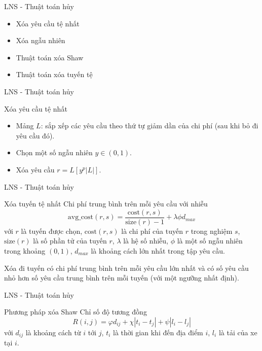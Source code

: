 \begin{frame}{LNS - Thuật toán hủy}
  \begin{itemize}
    \item Xóa yêu cầu tệ nhất
    \item Xóa ngẫu nhiên
    \item Thuật toán xóa Shaw
    \item Thuật toán xóa tuyến tệ
  \end{itemize}
\end{frame}

\begin{frame}{LNS - Thuật toán hủy}
  \begin{block}{Xóa yêu cầu tệ nhất}
    \begin{itemize}
      \item Mảng $L$: sắp xếp các yêu cầu theo thứ tự giảm dần của chi phí (sau khi bỏ đi yêu cầu đó).
      \item Chọn một số ngẫu nhiên $y \in (0,1)$.
      \item Xóa yêu cầu $r = L[y^p|L|]$.
    \end{itemize}
  \end{block}
\end{frame}

\begin{frame}{LNS - Thuật toán hủy}
  \begin{block}{Xóa tuyến tệ nhất}
    Chi phí trung bình trên mỗi yêu cầu với nhiễu
    \begin{equation}
      \label{eq:destroy_route}
      \text{avg\_cost}(r, s) = \frac{\text{cost}(r, s)}{\text{size}(r)-1} + \lambda \phi d_{max}
    \end{equation}
    với $r$ là tuyến được chọn, $\text{cost}(r,s)$ là chi phí của tuyến $r$ trong nghiệm $s$, $\text{size}(r)$ là số phần tử của tuyến $r$, $\lambda$ là hệ số nhiễu, $\phi$ là một số ngẫu nhiên trong khoảng $(0,1)$, $d_{max}$ là khoảng cách lớn nhất trong tập yêu cầu.
    
    Xóa đi tuyến có chi phí trung bình trên mỗi yêu cầu lớn nhất và có số yêu cầu nhỏ hơn số yêu cầu trung bình trên mỗi tuyến (với một ngưỡng nhất định).
  \end{block}
\end{frame}

\begin{frame}{LNS - Thuật toán hủy}
  \begin{block}{Phương pháp xóa Shaw}
    Chỉ số độ tương đồng 
    \begin{equation}
      \label{eq:shaw_related}
      R(i,j) = \varphi d_{ij} + \chi |t_{i}-t_{j}| + \psi|l_i - l_j|
    \end{equation}
    với $d_{ij}$ là khoảng cách từ $i$ tới $j$, $t_i$ là thời gian khi đến địa điểm $i$, $l_i$ là tải của xe tại $i$.
  \end{block}
\end{frame}

